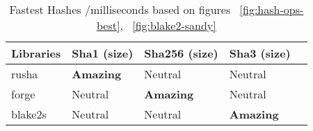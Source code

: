 \begin{table}[htpb]
\centering
\caption{Fastest Hashes /milliseconds based on figures ~\ref{fig:hash-ops-best}, ~\ref{fig:blake2-sandy}}
\label{tab:fastest-hashes}
\begin{adjustbox}{center, width=\columnwidth-20pt}
\begin{tabular}{|l|l|l|l|l|}
\hline
Libraries & Sha1 (size) & Sha256 (size) & Sha3 (size) \\ \hline
rusha    & \textbf{Amazing}    & Neutral    & Neutral        \\ \hline
forge    & Neutral    & \textbf{Amazing}    & Neutral        \\ \hline
blake2s    & Neutral    & Neutral    & \textbf{Amazing}    \\ \hline
\end{tabular}
\end{adjustbox}
\end{table}



